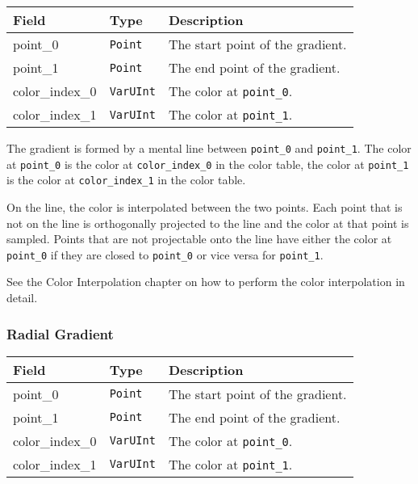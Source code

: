 \documentclass[]{article}
\begin{document}
\begin{longtable}[]{@{}p{1in}p{1in}p{4in}@{}}
\toprule
Field & Type & Description \\
\midrule
\endhead
point\_0        & \texttt{Point}   & The start point of the gradient. \\
point\_1        & \texttt{Point}   & The end point of the gradient. \\
color\_index\_0 & \texttt{VarUInt} & The color at \texttt{point\_0}. \\
color\_index\_1 & \texttt{VarUInt} & The color at \texttt{point\_1}. \\
\bottomrule
\end{longtable}

The gradient is formed by a mental line between \texttt{point\_0} and
\texttt{point\_1}. The color at \texttt{point\_0} is the color at
\texttt{color\_index\_0} in the color table, the color at
\texttt{point\_1} is the color at \texttt{color\_index\_1} in the color
table.

On the line, the color is interpolated between the two points.
Each point that is not on the line is orthogonally projected to the line
and the color at that point is sampled. Points that are not projectable
onto the line have either the color at \texttt{point\_0} if they are
closed to \texttt{point\_0} or vice versa for \texttt{point\_1}.

See the \hypertarget{color-interpolation}{Color Interpolation} chapter on how to perform the color interpolation in detail.

\hypertarget{radial-gradient}{\subsubsection{Radial Gradient}\label{radial-gradient}}

\begin{longtable}[]{@{}p{1in}p{1in}p{4in}@{}}
\toprule
Field & Type & Description \\
\midrule
\endhead
point\_0        & \texttt{Point}   & The start point of the gradient. \\
point\_1        & \texttt{Point}   & The end point of the gradient. \\
color\_index\_0 & \texttt{VarUInt} & The color at \texttt{point\_0}. \\
color\_index\_1 & \texttt{VarUInt} & The color at \texttt{point\_1}. \\
\bottomrule
\end{longtable}
\end{document}
